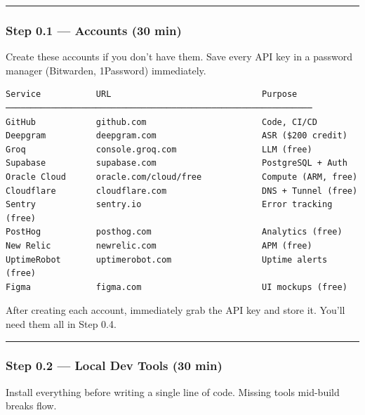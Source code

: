 \documentclass[
  11pt,
]{article}
\begin{document}
\begin{center}\rule{0.5\linewidth}{0.5pt}\end{center}

\hypertarget{step-0.1-accounts-30-min}{%
\subsubsection{Step 0.1 --- Accounts (30
min)}\label{step-0.1-accounts-30-min}}

Create these accounts if you don't have them. Save every API key in a
password manager (Bitwarden, 1Password) immediately.

\begin{lstlisting}
Service           URL                              Purpose
─────────────────────────────────────────────────────────────
GitHub            github.com                       Code, CI/CD
Deepgram          deepgram.com                     ASR ($200 credit)
Groq              console.groq.com                 LLM (free)
Supabase          supabase.com                     PostgreSQL + Auth
Oracle Cloud      oracle.com/cloud/free            Compute (ARM, free)
Cloudflare        cloudflare.com                   DNS + Tunnel (free)
Sentry            sentry.io                        Error tracking (free)
PostHog           posthog.com                      Analytics (free)
New Relic         newrelic.com                     APM (free)
UptimeRobot       uptimerobot.com                  Uptime alerts (free)
Figma             figma.com                        UI mockups (free)
\end{lstlisting}

After creating each account, immediately grab the API key and store it.
You'll need them all in Step 0.4.

\begin{center}\rule{0.5\linewidth}{0.5pt}\end{center}

\hypertarget{step-0.2-local-dev-tools-30-min}{%
\subsubsection{Step 0.2 --- Local Dev Tools (30
min)}\label{step-0.2-local-dev-tools-30-min}}

Install everything before writing a single line of code. Missing tools
mid-build breaks flow.
\end{document}
